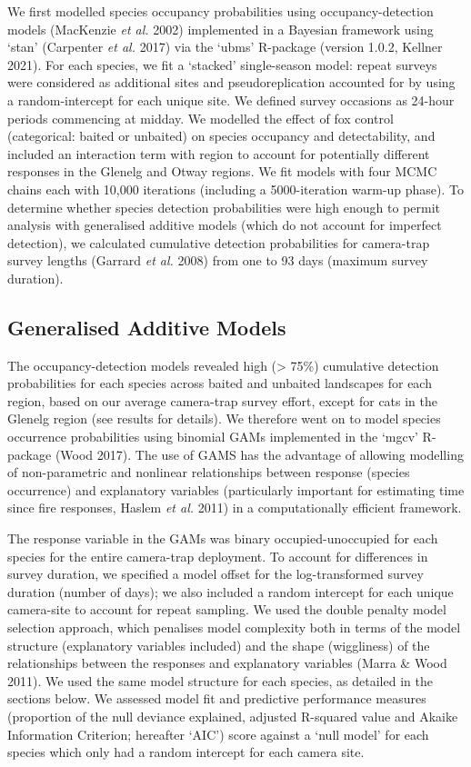 \documentclass[11pt,a4paper,titlepage,twoside,openright]{style/unimelbthesis}
\begin{document}
\begin{mainmatter}
We first modelled species occupancy probabilities using occupancy-detection models (MacKenzie \emph{et al.} 2002) implemented in a Bayesian framework using `stan' (Carpenter \emph{et al.} 2017) via the `ubms' R-package (version 1.0.2, Kellner 2021). For each species, we fit a `stacked' single-season model: repeat surveys were considered as additional sites and pseudoreplication accounted for by using a random-intercept for each unique site. We defined survey occasions as 24-hour periods commencing at midday. We modelled the effect of fox control (categorical: baited or unbaited) on species occupancy and detectability, and included an interaction term with region to account for potentially different responses in the Glenelg and Otway regions. We fit models with four MCMC chains each with 10,000 iterations (including a 5000-iteration warm-up phase). To determine whether species detection probabilities were high enough to permit analysis with generalised additive models (which do not account for imperfect detection), we calculated cumulative detection probabilities for camera-trap survey lengths (Garrard \emph{et al.} 2008) from one to 93 days (maximum survey duration).

\hypertarget{generalised-additive-models}{%
\subsection{Generalised Additive Models}\label{generalised-additive-models}}

The occupancy-detection models revealed high (\textgreater{} 75\%) cumulative detection probabilities for each species across baited and unbaited landscapes for each region, based on our average camera-trap survey effort, except for cats in the Glenelg region (see results for details). We therefore went on to model species occurrence probabilities using binomial GAMs implemented in the `mgcv' R-package (Wood 2017). The use of GAMS has the advantage of allowing modelling of non-parametric and nonlinear relationships between response (species occurrence) and explanatory variables (particularly important for estimating time since fire responses, Haslem \emph{et al.} 2011) in a computationally efficient framework.

The response variable in the GAMs was binary occupied-unoccupied for each species for the entire camera-trap deployment. To account for differences in survey duration, we specified a model offset for the log-transformed survey duration (number of days); we also included a random intercept for each unique camera-site to account for repeat sampling. We used the double penalty model selection approach, which penalises model complexity both in terms of the model structure (explanatory variables included) and the shape (wiggliness) of the relationships between the responses and explanatory variables (Marra \& Wood 2011). We used the same model structure for each species, as detailed in the sections below. We assessed model fit and predictive performance measures (proportion of the null deviance explained, adjusted R-squared value and Akaike Information Criterion; hereafter `AIC') score against a `null model' for each species which only had a random intercept for each camera site.


\end{mainmatter}
\end{document}
